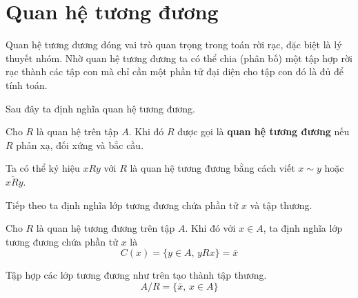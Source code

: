 \section{Quan hệ tương đương}

Quan hệ tương đương đóng vai trò quan trọng trong toán rời rạc, đặc biệt là lý
thuyết nhóm. Nhờ quan hệ tương đương ta có thể chia (phân bố) một tập hợp rời
rạc thành các tập con mà chỉ cần một phần tử đại diện cho tập con đó là đủ để
tính toán.

Sau đây ta định nghĩa quan hệ tương đương.

\begin{definition}
    Cho $R$ là quan hệ trên tập $A$. Khi đó $R$ được gọi là \textbf{quan hệ
    tương đương} nếu $R$ phản xạ, đối xứng và bắc cầu.

    Ta có thể ký hiệu $x R y$ với $R$ là quan hệ tương đương bằng cách viết
    $x \sim y$ hoặc $x \widetilde{R} y$.
\end{definition}

Tiếp theo ta định nghĩa lớp tương đương chứa phần tử $x$ và tập thương.

\begin{definition}
    Cho $R$ là quan hệ tương đương trên tập $A$. Khi đó với $x \in A$, ta định
    nghĩa lớp tương đương chứa phần tử $x$ là
    \[C (x) = \{ y \in A, \, y R x \} = \bar{x}\]
\end{definition}

\begin{definition}
    Tập hợp các lớp tương đương như trên tạo thành tập thương.
    \[A / R = \{ \bar{x}, \, x \in A \}\]
\end{definition}

